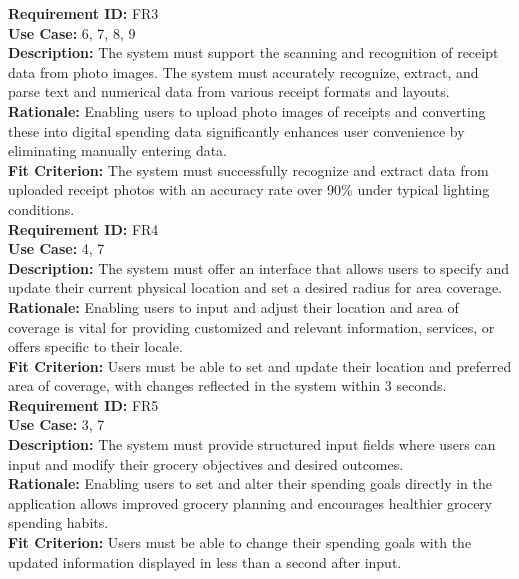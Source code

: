 \documentclass[12pt]{article}
\begin{document}
\medskip
\noindent \textbf{Requirement ID:} FR3\\
\textbf{Use Case:} 6, 7, 8, 9\\
\textbf{Description:} The system must support the scanning and recognition of receipt data from photo images. The system must accurately recognize, extract, and parse text and numerical data from various receipt formats and layouts.\\
\textbf{Rationale:} Enabling users to upload photo images of receipts and converting these into digital spending data significantly enhances user convenience by eliminating manually entering data.\\
\textbf{Fit Criterion:} The system must successfully recognize and extract data from uploaded receipt photos with an accuracy rate over 90\% under typical lighting conditions.\\

\medskip
\noindent \textbf{Requirement ID:} FR4\\
\textbf{Use Case:} 4, 7\\
\textbf{Description:} The system must offer an interface that allows users to specify and update their current physical location and set a desired radius for area coverage.\\
\textbf{Rationale:} Enabling users to input and adjust their location and area of coverage is vital for providing customized and relevant information, services, or offers specific to their locale.\\
\textbf{Fit Criterion:} Users must be able to set and update their location and preferred area of coverage, with changes reflected in the system within 3 seconds.\\

\medskip
\noindent \textbf{Requirement ID:} FR5\\
\textbf{Use Case:} 3, 7\\
\textbf{Description:} The system must provide structured input fields where users can input and modify their grocery objectives and desired outcomes.\\
\textbf{Rationale:} Enabling users to set and alter their spending goals directly in the application allows improved grocery planning and encourages healthier grocery spending habits.\\
\textbf{Fit Criterion:} Users must be able to change their spending goals with the updated information displayed in less than a second after input.\\
\end{document}
